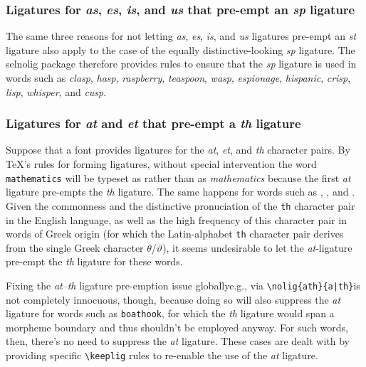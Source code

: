 \documentclass[11pt]{article}
\newcommand{\pkg}[1]{\textsf{#1}}
\newcommand{\opt}[1]{\texttt{#1}}
\newcommand{\cmmd}[1]{\texttt{\textbackslash #1}}
\begin{document}
\subsubsection*{Ligatures for \emph{as}, \emph{\ebg es}, \emph{is}, and \emph{us} that pre-empt an \emph{sp} ligature}

The same three reasons for not letting \emph{as}, \emph{\ebg es}, \emph{is}, and \emph{us} ligatures pre-empt an \emph{st} ligature also apply to the case of the equally distinctive-looking \emph{sp} ligature. The \pkg{selnolig} package therefore provides rules to ensure that the \emph{sp} ligature is used in words such as \emph{clasp}, \emph{hasp}, \emph{raspberry}, \emph{teaspoon}, \emph{wasp}, \emph{\ebg espionage}, \emph{hispanic}, \emph{crisp}, \emph{lisp}, \emph{whisper}, and \emph{cusp}. 



\subsubsection*{Ligatures for \emph{at} and \emph{et} that pre-empt a \emph{th} ligature}

Suppose that a font provides ligatures for the \emph{at}, \emph{et}, and \emph{th} character pairs. By \TeX's rules for forming ligatures, without special intervention the word \opt{mathematics} will be typeset as \emph{} rather than as \emph{mathematics} because the first \emph{at} ligature pre-empts the \emph{th} ligature. The same happens for words such as \emph{}, \emph{}, and \emph{}.
Given the commonness and the distinctive pronuciation of the \opt{th} character pair in the English language, as well as the high frequency of this character pair in words of Greek origin (for which the Latin-alphabet \opt{th} character pair derives from the single Greek character $\theta$/$\vartheta$), it seems undesirable to let the \emph{at}-ligature pre-empt the \emph{th} ligature for these words. 

Fixing the \emph{at}--\emph{th} ligature pre-emption issue globally\textemdash e.g., via \Verb+\nolig{ath}{a|th}+\textemdash is not completely innocuous, though, because doing so will also suppress the \emph{at} ligature for words such as \opt{boathook}, for which the \emph{th} ligature would span a morpheme boundary and thus shouldn't be employed anyway. For such words, then, there's no need to suppress the \emph{at} ligature. These cases are dealt with by providing specific \cmmd{keeplig} rules to re-enable the use of the \emph{at} ligature.
\end{document}
